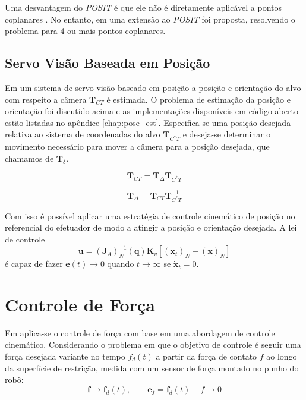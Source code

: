 Uma desvantagem do \textit{POSIT} é que ele não é diretamente aplicável a pontos coplanares \cite{marchand2016pose}. No entanto, em \cite{oberkampf1996iterative} uma extensão ao \textit{POSIT} foi proposta, resolvendo o problema para 4 ou mais pontos coplanares. 


\subsection{Servo Visão Baseada em Posição}
Em um sistema de servo visão baseado em posição a posição e orientação do alvo com respeito a câmera $\bm{T}_{CT}$ é estimada. O problema de estimação da posição e orientação foi discutido acima e as implementações disponíveis em código aberto estão listadas no apêndice \ref{chap:pose_est}.
Especifica-se uma posição desejada relativa ao sistema de coordenadas do alvo  $\bm{T}_{C^*T}$ e deseja-se determinar o movimento necessário para mover a câmera para a posição desejada, que chamamos de $\bm{T}_\delta$.

\begin{equation}
 \bm{T}_{CT} =  \bm{T}_\Delta \bm{T}_{C^*T}
\end{equation}

\begin{equation}
 \bm{T}_\Delta  =   \bm{T}_{CT} \bm{T}_{C^*T}^{-1}
\end{equation}

Com isso é possível aplicar uma estratégia de controle cinemático de posição no referencial do efetuador de modo a atingir a posição e orientação desejada. A lei de controle
\begin{equation}
\bm{u} = (\bm{J}_A)_N^{-1}(\bm{q})\bm{K}_v[(\bm{x}_t)_N - (\bm{x})_N]
\end{equation}
é capaz de fazer $\bm{e}(t) \rightarrow 0$ quando $t \rightarrow \infty$ se $\dot{\bm{x}}_t = 0$.

\section{Controle de Força}

Em \cite{leite2011servo} aplica-se o controle de força com base em uma abordagem de controle cinemático. Considerando o problema em que o objetivo de controle é seguir uma força desejada variante no tempo $f_d(t)$ a partir da força de contato $f$ ao longo da superfície de restrição, medida com um sensor de força montado no punho do robô:
\begin{equation} \label{eq:problema_ctrl_forca}
\bm{f} \rightarrow \bm{f}_d(t), \qquad \bm{e}_f = \bm{f}_d(t) - f \rightarrow 0
\end{equation}

